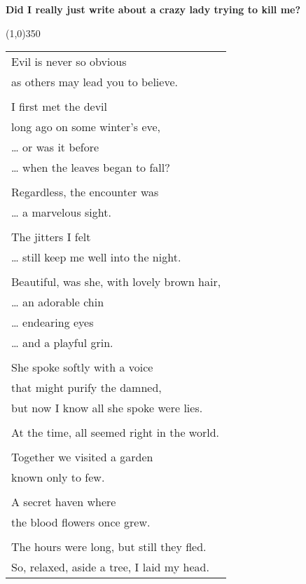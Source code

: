 \documentclass{article}
\begin{document}
\newcommand{\h}{\hspace{3ex}}
\newcommand{\hoar}{%
\begin{center}
\line(1,0){350}
\end{center}
}

\begin{center}
\textbf{Did I really just write about a crazy lady trying to kill me?}
\hoar
\begin{tabular}{l}
Evil is never so obvious \\
\h as others may lead you to believe. \\
\\
I first met the devil \\
\h long ago on some winter's eve, \\
\h\ldots{} or was it before \\
\h\ldots{} when the leaves began to fall? \\
\\
Regardless, the encounter was \\
\h\ldots{} a marvelous sight. \\
\\
The jitters I felt \\
\h\ldots{} still keep me well into the night. \\
\\
Beautiful, was she, with lovely brown hair, \\
\h\ldots{} an adorable chin \\
\h\ldots{} endearing eyes \\
\h\ldots{} and a playful grin. \\
\\
She spoke softly with a voice \\
\h that might purify the damned, \\
\h but now I know all she spoke were lies. \\
\\
At the time, all seemed right in the world. \\
\\
Together we visited a garden \\
\h known only to few. \\
\\
A secret haven where \\
\h the blood flowers once grew. \\
\\
The hours were long, but still they fled. \\
So, relaxed, aside a tree, I laid my head. \\

\end{tabular}
\end{center}
\end{document}

